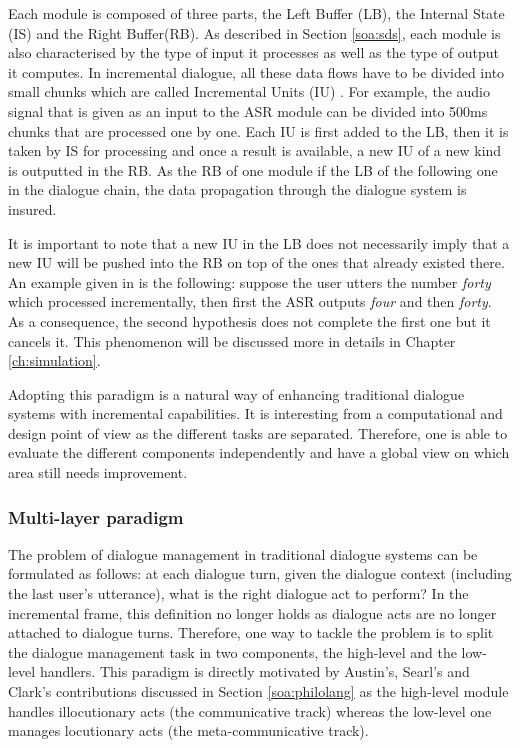            Each module is composed of three parts, the Left Buffer (LB), the Internal State (IS) and the Right Buffer(RB). As described in Section \ref{soa:sds}, each module is also characterised by the type of input it processes as well as the type of output it computes. In incremental dialogue, all these data flows have to be divided into small chunks which are called Incremental Units (IU) \cite{Schlangen2011}. For example, the audio signal that is given as an input to the ASR module can be divided into 500ms chunks that are processed one by one. Each IU is first added to the LB, then it is taken by IS for processing and once a result is available, a new IU of a new kind is outputted in the RB. As the RB of one module if the LB of the following one in the dialogue chain, the data propagation through the dialogue system is insured.
            
            It is important to note that a new IU in the LB does not necessarily imply that a new IU will be pushed into the RB on top of the ones that already existed there. An example given in \cite{Schlangen2011} is the following: suppose the user utters the number \textit{forty} which processed incrementally, then first the ASR outputs \textit{four} and then \textit{forty}. As a consequence, the second hypothesis does not complete the first one but it cancels it. This phenomenon will be discussed more in details in Chapter \ref{ch:simulation}.
            
            Adopting this paradigm is a natural way of enhancing traditional dialogue systems with incremental capabilities. It is interesting from a computational and design point of view as the different tasks are separated. Therefore, one is able to evaluate the different components independently \cite{Baumann2011} and have a global view on which area still needs improvement.
        
        \subsubsection{Multi-layer paradigm}
        
        	The problem of dialogue management in traditional dialogue systems can be formulated as follows: at each dialogue turn, given the dialogue context (including the last user's utterance), what is the right dialogue act to perform? In the incremental frame, this definition no longer holds as dialogue acts are no longer attached to dialogue turns. Therefore, one way to tackle the problem is to split the dialogue management task in two components, the high-level and the low-level handlers. This paradigm is directly motivated by Austin's, Searl's and Clark's contributions discussed in Section \ref{soa:philolang} as the high-level module handles illocutionary acts (the communicative track) whereas the low-level one manages locutionary acts (the meta-communicative track).
            
